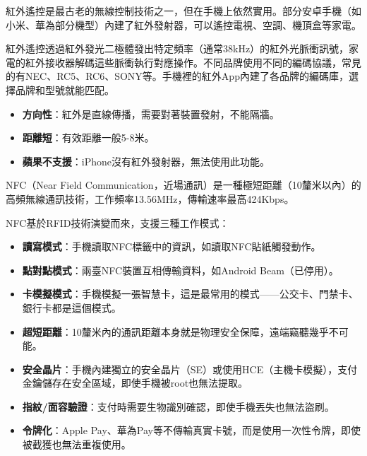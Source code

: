 
紅外遙控是最古老的無線控制技術之一，但在手機上依然實用。部分安卓手機（如小米、華為部分機型）內建了紅外發射器，可以遙控電視、空調、機頂盒等家電。


紅外遙控透過紅外發光二極體發出特定頻率（通常38kHz）的紅外光脈衝訊號，家電的紅外接收器解碼這些脈衝執行對應操作。不同品牌使用不同的編碼協議，常見的有NEC、RC5、RC6、SONY等。手機裡的紅外App內建了各品牌的編碼庫，選擇品牌和型號就能匹配。


\begin{itemize}
  \item \textbf{方向性}：紅外是直線傳播，需要對著裝置發射，不能隔牆。
  \item \textbf{距離短}：有效距離一般5-8米。
  \item \textbf{蘋果不支援}：iPhone沒有紅外發射器，無法使用此功能。
\end{itemize}


NFC（Near Field Communication，近場通訊）是一種極短距離（10釐米以內）的高頻無線通訊技術，工作頻率13.56MHz，傳輸速率最高424Kbps。


NFC基於RFID技術演變而來，支援三種工作模式：

\begin{itemize}
  \item \textbf{讀寫模式}：手機讀取NFC標籤中的資訊，如讀取NFC貼紙觸發動作。
  \item \textbf{點對點模式}：兩臺NFC裝置互相傳輸資料，如Android Beam（已停用）。
  \item \textbf{卡模擬模式}：手機模擬一張智慧卡，這是最常用的模式——公交卡、門禁卡、銀行卡都是這個模式。
\end{itemize}


\begin{itemize}
  \item \textbf{超短距離}：10釐米內的通訊距離本身就是物理安全保障，遠端竊聽幾乎不可能。
  \item \textbf{安全晶片}：手機內建獨立的安全晶片（SE）或使用HCE（主機卡模擬），支付金鑰儲存在安全區域，即使手機被root也無法提取。
  \item \textbf{指紋/面容驗證}：支付時需要生物識別確認，即使手機丟失也無法盜刷。
  \item \textbf{令牌化}：Apple Pay、華為Pay等不傳輸真實卡號，而是使用一次性令牌，即使被截獲也無法重複使用。
\end{itemize}

